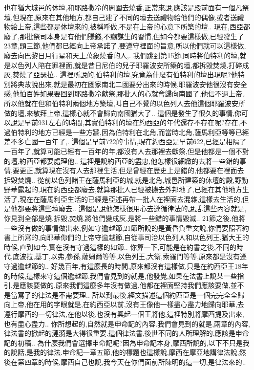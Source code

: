 \documentclass{book}
\begin{document}
也在猶大城邑的休壇,和耶路撒冷的周圍去燒香,正常來說,應該是殿前面有一個凡祭壇,但現在,原來在其他地方,都自己建了不同的壇去送禮物給他們的偶像,或者送禮物給上帝,這些都是休壇來的,被稱呼做,不是在上帝的心意下所築的壇..
現在,西亞都廢了,那批祭司本身是有他們賺錢,不嬲謀生的習慣,但如今都要這樣做,已經發生了23章,頭三節,他們都已經向上帝承諾了,要遵守裡面的旨意,所以他們就可以這樣做,廢去向巴黎日月行星和天上萬象燒香的人,.
我們跳到第15節,同時將伯特利的壇,就是以色列人陷在罪裡面,就是昔日尼伯的兒子耶羅波安所築的壇,都拆毀焚燒,打碎成灰,焚燒了亞瑟拉..
這裡所說的,伯特利的壇,究竟為什麼有伯特利的壇出現呢?他特別將典故說出來,就是最初在國家南北二國要分出來的時候,耶羅波安他很沒有安全感,他怕百姓如果要回到耶路撒冷獻祭,那批人的心就會歸向南國了,他信不過上帝,.
所以他就在但和伯特利兩個地方築壇,叫自己不覺的以色列人去他這個耶羅波安所做的壇,來敬拜上帝,這樣心就不會歸向南國猶大了..
這個是發生了很久的事情,你可以說是早前931左右的時間,其實伯特利的壇在約西亞的年代還存不存在呢?存在,不過伯特利的地方已經是一些方牆,因為伯特利在北角,而當時北角,薩馬利亞等等已經差不多亡國一百年了,.
這個是早前722的事情,現在約西亞是早前622,已經是相隔了一百年了,就算可能已經有一百年的年,都沒有人去那裡去獻祭,但是他都是一個不對的壇,約西亞都要處理他..
這裡是說約西亞的盡忠,他怎樣很細緻的去將一些錯的事情,要更正,就算現在沒有人去那裡生活,但是曾經在歷史上是錯的,他都要在裡面去拆毀焚燒..
從前以色列諸王在薩馬利亞的城,就是北角,城邑所建築的休壇的殿,野動野華露起的,現在約西亞都廢去,就算那批人已經被擄去外邦地了,已經在其他地方生活了,現在在薩馬利亞生活的已經是亞述再帶一批人在裡面去混雜,這樣去生活的,但是他都要將這些壇廢去..
這個是說他怎樣很用心去遵循律法的說話.這些內容就是,你見到全部是燒,拆毀,焚燒,將他們變成灰,是將一些錯的事情毀滅..
21節之後,他將一些沒有做的事情做出來,例如守逾越節,21節所說的是黃昏負重文說,你們要照著約書上所寫的,向耶華你們的上帝守逾越節,自從事司治以色列人和以色列王,猶大王的時候,直到如今,實在沒有守過這樣的如節..
你算一下,可能是在約書之後,不同的時代,底波拉,基丁,以弗,參孫,薩姆爾等等,以色列王,大衛,索羅門等等,原來都是沒有遵守過逾越節的..
好幾百年,有這麼長的時間,原來都沒有這樣做,只是在約西亞王18年的時候,這樣來守這個逾越節.我們會見到的就是,他發覺,如果在法書上說某一些指引,是應該要做的,原來我們這麼多年沒有做過,他都在裡面堅持我們應該要做,並不是當寫了的律法是不需要理..
所以到最後,經文描述這個約西亞是一個完完全全歸向上帝,他在用的字眼就是,在約西亞以前,沒有王像他一樣盡心盡力地歸向耶華,去遵行摩西的一切律法,在他以後,也沒有興起一個王將他,這裡特別將摩西提及出來,也有盡心盡力..
你所想起的,自然就是申命記的內容.我們會見到的就是,兩章的內容,律法書的掀起的漣漪是大得很重要.這個律法書,後世不同的人所理解的,應該是申命記的初稿..
為什麼我們會選擇申命記呢?因為申命記本身,摩西所說的,以下不只是我的說話,是我的律法.申命記一章五節,他的標題也這樣說,摩西在摩亞地講律法說,然後在第四章的時候,摩西自己也說,我今天在你們面前所陳明的這一切,是律法來的..
\end{document}
